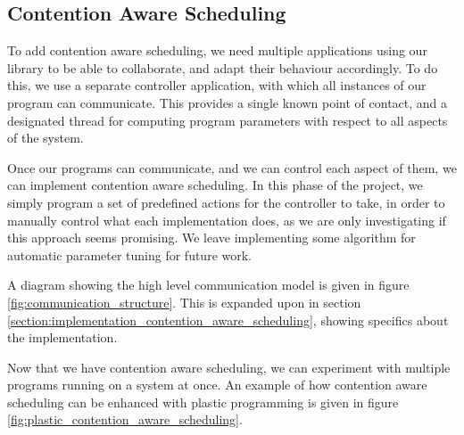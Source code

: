 \subsection{Contention Aware Scheduling}
\label{subsection:design_contention_aware_scheduling}

To add contention aware scheduling, we need multiple applications using our library to be able to collaborate, and adapt their behaviour accordingly. To do this, we use a separate controller application, with which all instances of our program can communicate. This provides a single known point of contact, and a designated thread for computing program parameters with respect to all aspects of the system.

Once our programs can communicate, and we can control each aspect of them, we can implement contention aware scheduling. In this phase of the project, we simply program a set of predefined actions for the controller to take, in order to manually control what each implementation does, as we are only investigating if this approach seems promising. We leave implementing some algorithm for automatic parameter tuning for future work.

A diagram showing the high level communication model is given in figure \ref{fig:communication_structure}. This is expanded upon in section \ref{section:implementation_contention_aware_scheduling}, showing specifics about the implementation.

Now that we have contention aware scheduling, we can experiment with multiple programs running on a system at once. An example of how contention aware scheduling can be enhanced with plastic programming is given in figure \ref{fig:plastic_contention_aware_scheduling}.



